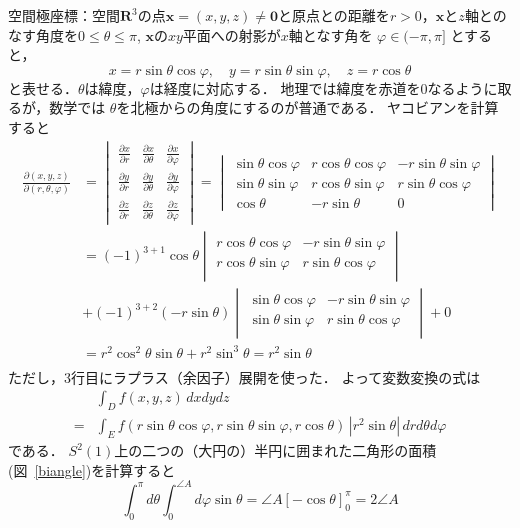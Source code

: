空間極座標：空間$\mathbf R^3$の点$\mathbf x=(x,y,z)\neq\mathbf 0$と原点との距離を$r>0$，$\mathbf x$と$z$軸とのなす角度を$0\le \theta\le \pi$,
$\mathbf x$の$xy$平面への射影が$x$軸となす角を $\varphi\in (-\pi,\pi]$
とすると，
\[
	x=r\sin \theta\cos \varphi,\quad 
	y=r\sin \theta\sin \varphi, \quad 
	z=r\cos \theta
\]
と表せる．$\theta$は緯度，$\varphi$は経度に対応する．
地理では緯度を赤道を$0$なるように取るが，数学では
$\theta$を北極からの角度にするのが普通である．
ヤコビアンを計算すると
\[
\begin{split}
	\frac{\partial(x,y,z)}{\partial(r,\theta,\varphi)}
	&=\begin{vmatrix}
	 	\frac{\partial x}{\partial r}&\frac{\partial x}{\partial \theta}&\frac{\partial x}{\partial \varphi}\\
		\frac{\partial y}{\partial r}&\frac{\partial y}{\partial \theta}
		&\frac{\partial y}{\partial \varphi}\\
		\frac{\partial z}{\partial r}&\frac{\partial z}{\partial \theta}
		&\frac{\partial z}{\partial \varphi}
	\end{vmatrix}=\begin{vmatrix}
	 	\sin \theta\cos \varphi&r\cos \theta\cos \varphi&-r\sin \theta\sin\varphi\\
		\sin \theta\sin \varphi&r\cos \theta\sin \varphi&r\sin \theta\cos \varphi\\
		\cos \theta&-r\sin \theta&0
	\end{vmatrix}\\
	&=
	(-1)^{3+1}\cos \theta
	\begin{vmatrix}
	 	r\cos \theta\cos \varphi&-r\sin \theta\sin\varphi\\
		r\cos \theta\sin \varphi&r\sin \theta\cos \varphi\\
	\end{vmatrix}\\
	&+(-1)^{3+2}(-r\sin \theta)
	\begin{vmatrix}
	 	\sin \theta\cos \varphi&-r\sin \theta\sin\varphi\\
		\sin \theta\sin \varphi&r\sin \theta\cos \varphi\\
	\end{vmatrix} +0\\
	&=r^2\cos^2 \theta\sin \theta +r^2\sin^3 \theta
	=r^2\sin \theta\\
	\end{split}
\]
ただし，3行目にラプラス（余因子）展開を使った．
よって変数変換の式は
\begin{equation*}
\begin{split}
	&\int_D f(x,y,z)\, dxdydz
	\\
	=&\int_{E} 
		f(r\sin \theta\cos \varphi,
		r\sin \theta\sin \varphi, 
		r\cos \theta)\,
		|r^2\sin \theta|\,  
	drd\theta d\varphi
\end{split}
\end{equation*}
である．
$S^2(1)$上の二つの（大円の）半円に囲まれた二角形の面積(図~\ref{biangle})を計算すると
\begin{equation}\label{areaBiangle}
	\int_0^\pi d\theta \int_0^{\angle A}d\varphi 
	\sin \theta
	=\angle A [-\cos \theta ]_0^\pi=2\angle A
\end{equation}


